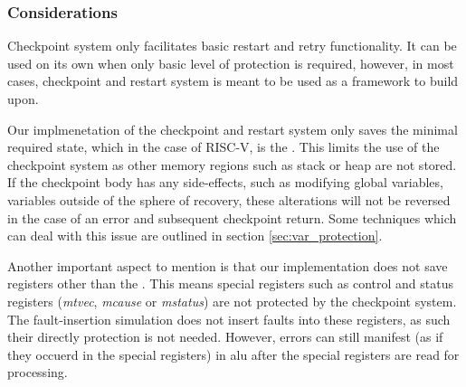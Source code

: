 \subsubsection{Considerations} \label{sec:checkpoint_considerations}

Checkpoint system only facilitates basic restart and retry functionality. It can be used on its own when only basic level of protection is required, however, in most cases, checkpoint and restart system is meant to be used as a framework to build upon.

Our implmenetation of the checkpoint and restart system only saves the minimal required state, which in the case of RISC-V, is the . This limits the use of the checkpoint system as other memory regions such as stack or heap are not stored. If the checkpoint body has any side-effects, such as modifying global variables, variables outside of the sphere of recovery, these alterations will not be reversed in the case of an error and subsequent checkpoint return. Some techniques which can deal with this issue are outlined in section \ref{sec:var_protection}.

Another important aspect to mention is that our implementation does not save registers other than the . This means special registers such as control and status registers (\textit{mtvec}, \textit{mcause} or \textit{mstatus}) are not protected by the checkpoint system. The fault-insertion simulation does not insert faults into these registers, as such their directly protection is not needed. However, errors can still manifest (as if they occuerd in the special registers) in \acrshort{alu} after the special registers are read for processing.
